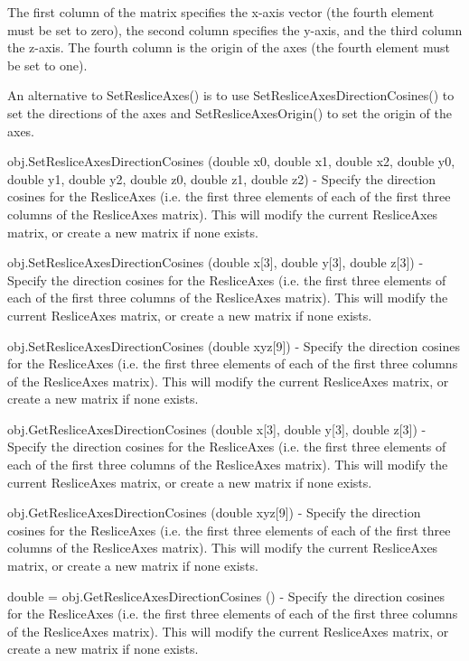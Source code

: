 \begin{DoxyItemize}
The first column of the matrix specifies the x-\/axis vector (the fourth element must be set to zero), the second column specifies the y-\/axis, and the third column the z-\/axis. The fourth column is the origin of the axes (the fourth element must be set to one). 

An alternative to Set\-Reslice\-Axes() is to use Set\-Reslice\-Axes\-Direction\-Cosines() to set the directions of the axes and Set\-Reslice\-Axes\-Origin() to set the origin of the axes.  
\item {\ttfamily obj.\-Set\-Reslice\-Axes\-Direction\-Cosines (double x0, double x1, double x2, double y0, double y1, double y2, double z0, double z1, double z2)} -\/ Specify the direction cosines for the Reslice\-Axes (i.\-e. the first three elements of each of the first three columns of the Reslice\-Axes matrix). This will modify the current Reslice\-Axes matrix, or create a new matrix if none exists.  
\item {\ttfamily obj.\-Set\-Reslice\-Axes\-Direction\-Cosines (double x\mbox{[}3\mbox{]}, double y\mbox{[}3\mbox{]}, double z\mbox{[}3\mbox{]})} -\/ Specify the direction cosines for the Reslice\-Axes (i.\-e. the first three elements of each of the first three columns of the Reslice\-Axes matrix). This will modify the current Reslice\-Axes matrix, or create a new matrix if none exists.  
\item {\ttfamily obj.\-Set\-Reslice\-Axes\-Direction\-Cosines (double xyz\mbox{[}9\mbox{]})} -\/ Specify the direction cosines for the Reslice\-Axes (i.\-e. the first three elements of each of the first three columns of the Reslice\-Axes matrix). This will modify the current Reslice\-Axes matrix, or create a new matrix if none exists.  
\item {\ttfamily obj.\-Get\-Reslice\-Axes\-Direction\-Cosines (double x\mbox{[}3\mbox{]}, double y\mbox{[}3\mbox{]}, double z\mbox{[}3\mbox{]})} -\/ Specify the direction cosines for the Reslice\-Axes (i.\-e. the first three elements of each of the first three columns of the Reslice\-Axes matrix). This will modify the current Reslice\-Axes matrix, or create a new matrix if none exists.  
\item {\ttfamily obj.\-Get\-Reslice\-Axes\-Direction\-Cosines (double xyz\mbox{[}9\mbox{]})} -\/ Specify the direction cosines for the Reslice\-Axes (i.\-e. the first three elements of each of the first three columns of the Reslice\-Axes matrix). This will modify the current Reslice\-Axes matrix, or create a new matrix if none exists.  
\item {\ttfamily double = obj.\-Get\-Reslice\-Axes\-Direction\-Cosines ()} -\/ Specify the direction cosines for the Reslice\-Axes (i.\-e. the first three elements of each of the first three columns of the Reslice\-Axes matrix). This will modify the current Reslice\-Axes matrix, or create a new matrix if none exists.  

\end{DoxyItemize}
